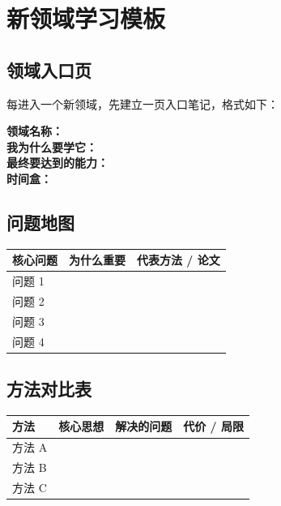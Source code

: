 
\section{新领域学习模板}

\subsection{领域入口页}

每进入一个新领域，先建立一页入口笔记，格式如下：

\begin{conceptbox}
\textbf{领域名称：} \underline{\hspace{8cm}}\\
\textbf{我为什么要学它：} \underline{\hspace{7cm}}\\
\textbf{最终要达到的能力：} \underline{\hspace{6.6cm}}\\
\textbf{时间盒：} \underline{\hspace{8.5cm}}
\end{conceptbox}

\subsection{问题地图}

\begin{center}
{\small
\begin{tabular}{p{3.2cm}p{4.8cm}p{5.2cm}}
\hline
\textbf{核心问题} & \textbf{为什么重要} & \textbf{代表方法 / 论文} \\
\hline
问题 1 & & \\
问题 2 & & \\
问题 3 & & \\
问题 4 & & \\
\hline
\end{tabular}
}
\end{center}

\subsection{方法对比表}

\begin{center}
{\small
\begin{tabular}{p{2.8cm}p{3.4cm}p{3.4cm}p{3.4cm}}
\hline
\textbf{方法} & \textbf{核心思想} & \textbf{解决的问题} & \textbf{代价 / 局限} \\
\hline
方法 A & & & \\
方法 B & & & \\
方法 C & & & \\
\hline
\end{tabular}
}
\end{center}

